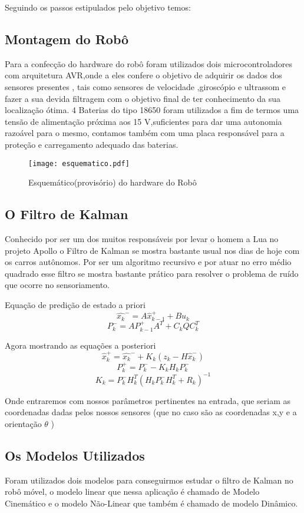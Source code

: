\documentclass[11pt]{article}
\begin{document}
Seguindo os passos estipulados pelo objetivo temos:

\subsection{Montagem do Robô}
 Para a confecção do hardware do robô foram utilizados dois microcontroladores com arquitetura AVR,onde a eles confere o objetivo de adquirir os dados dos sensores presentes , tais como sensores de velocidade ,giroscópio e ultrassom e fazer a sua devida filtragem com o objetivo final de ter conhecimento da sua localização ótima. 4 Baterias do tipo 18650 foram utilizados a fim de termos uma tensão de alimentação próxima aos 15 V,suficientes para dar uma autonomia razoável para o mesmo, contamos também com uma placa responsável para a proteção e carregamento adequado das baterias.

 
 \begin{center}
 \begin{figure}[!h]
 \texttt{[image: esquematico.pdf]}
 \caption{Esquemático(provisório) do hardware do Robô} 
 \end{figure}
 \end{center}

\subsection{O Filtro de Kalman}
Conhecido por ser um dos muitos responsáveis por levar o homem a Lua no projeto Apollo o Filtro de Kalman se mostra bastante usual nos dias de hoje com os carros autônomos. Por ser  um algoritmo recursivo e por atuar no erro médio quadrado esse filtro se mostra bastante prático para resolver o problema de ruído que ocorre no sensoriamento.

 Equação de predição de estado a priori\\
$$
\hat{x_{k}}^{-}=A\hat{x}_{k-1}^{+} +Bu_k $$
$$
P_{k}^{-}=AP_{k-1}^{+}A^{T} + C_kQC_k^T
$$

Agora mostrando as equações a posteriori\\

$$
\hat{x}_{k}^{+}=\hat{x_{k}}^{-} + K_{k}(z_{k} - H\hat{x}_k^-)
$$
$$
P_{k}^{+}=P_k^- -K_kH_kP_k^- 
$$
$$
K_k=P_k^{-}H^{T}_{k}(H_k P_{k}^{-}H_k^{T}+R_{k})^{-1}$$


 Onde entraremos com nossos parâmetros pertinentes na entrada, que seriam as coordenadas dadas pelos nossos sensores (que no caso são as coordenadas x,y e a orientação $\theta$ )
 \subsection{Os Modelos Utilizados}
 Foram utilizados dois modelos para conseguirmos estudar o filtro de Kalman no robô móvel, o modelo linear que nessa aplicação é chamado de Modelo Cinemático e o modelo Não-Linear que também é chamado de modelo Dinâmico.
\end{document}
